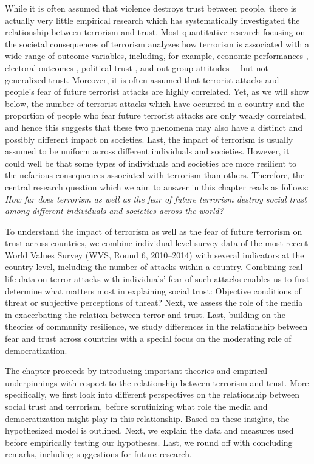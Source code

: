 While it is often assumed that violence destroys trust between people, there is actually very little empirical research which has systematically investigated the relationship between terrorism and trust. Most quantitative research focusing on the societal consequences of terrorism analyzes how terrorism is associated with a wide range of outcome variables, including, for example, economic performances \citep{Gaibulloev2011a, Eckstein2004, Fielding2003}, electoral outcomes \citep{Alonso2013a, Montalvo2011}, political trust \citep{Dinesen2013a}, and out-group attitudes \citep{Legewie2013}—but not generalized trust. Moreover, it is often assumed that terrorist attacks and people’s fear of future terrorist attacks are highly correlated. Yet, as we will show below, the number of terrorist attacks which have occurred in a country and the proportion of people who fear future terrorist attacks are only weakly correlated, and hence this suggests that these two phenomena may also have a distinct and possibly different impact on societies. Last, the impact of terrorism is usually assumed to be uniform across different individuals and societies. However, it could well be that some types of individuals and societies are more resilient to the nefarious consequences associated with terrorism than others. Therefore, the central research question which we aim to answer in this chapter reads as follows: \textit{How far does terrorism as well as the fear of future terrorism destroy social trust among different individuals and societies across the world?}


To understand the impact of terrorism as well as the fear of future terrorism on trust across countries, we combine individual-level survey data of the most recent World Values Survey (WVS, Round 6, 2010–2014) with several indicators at the country-level, including the number of attacks within a country. Combining real-life data on terror attacks with individuals’ fear of such attacks enables us to first determine what matters most in explaining social trust: Objective conditions of threat or subjective perceptions of threat? Next, we assess the role of the media in exacerbating the relation between terror and trust. Last, building on the theories of community resilience, we study differences in the relationship between fear and trust across countries with a special focus on the moderating role of democratization. 


The chapter proceeds by introducing important theories and empirical underpinnings with respect to the relationship between terrorism and trust. More specifically, we first look into different perspectives on the relationship between social trust and terrorism, before scrutinizing what role the media and democratization might play in this relationship. Based on these insights, the hypothesized model is outlined. Next, we explain the data and measures used before empirically testing our hypotheses. Last, we round off with concluding remarks, including suggestions for future research.


